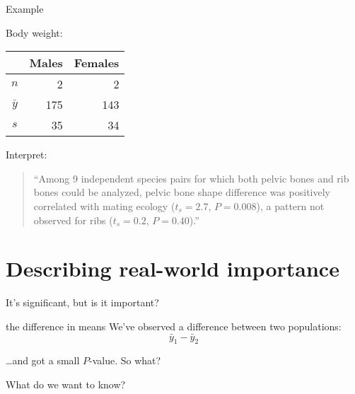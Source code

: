 \begin{frame}{Example}

  Body weight:
  \begin{center}
    \begin{tabular}{crr}
       & Males & Females \\
       \hline
       $n$ & 2 & 2 \\
       $\bar y$ & 175 & 143 \\
       $s$ & 35 & 34
     \end{tabular}

   \vspace{2em}

   \end{center}

\end{frame}


\begin{frame}{Interpret:}

  \begin{quote}
    ``Among 9 independent species pairs for which both pelvic bones and rib bones could be analyzed, pelvic bone shape difference was positively correlated with mating ecology ($t_s=2.7$, $P=0.008$), a pattern not observed for ribs ($t_s=0.2$, $P=0.40$).''
  \end{quote}

\end{frame}



\section{Describing real-world importance}


\begin{frame}{It's significant, but is it important?}


    \begin{block}{the difference in means}
        We've observed a difference between two populations:
        \[  \bar y_1 - \bar y_2 \]
    \end{block}

    \ldots and got a small $P$-value.  So what?

    \vspace{2em}

     What do we want to know?

\end{frame}


